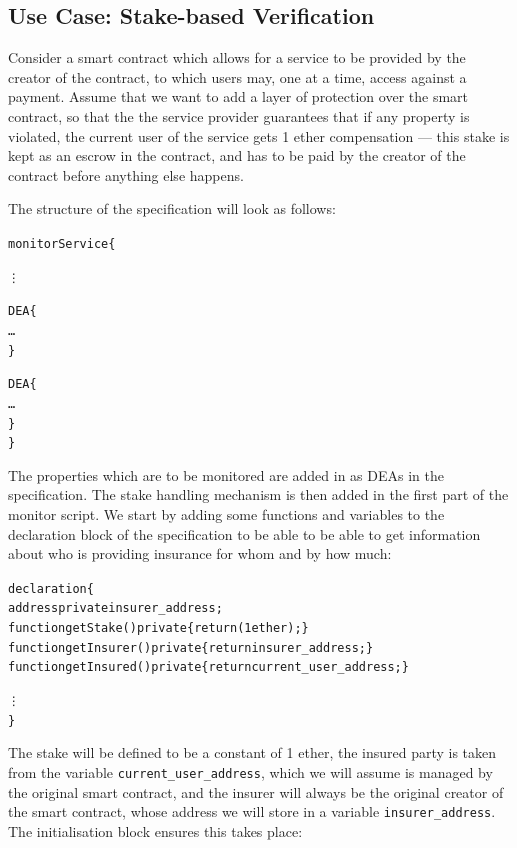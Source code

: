 \documentclass{article}
\begin{document}
  \subsection{Use Case: Stake-based Verification}
  \label{s:example}

  Consider a smart contract which allows for a service to be provided by the creator of the contract, to which users may, one at a time, access against a payment. Assume that we want to add a layer of protection over the smart contract, so that the the service provider guarantees that if any property is violated, the current user of the service gets 1 ether compensation --- this stake is kept as an escrow in the contract, and has to be paid by the creator of the contract before anything else happens. 
  
  The structure of the specification will look as follows:
  
  \small\begin{alltt}
    monitor Service \{
      
      \vdots 
           
      DEA \{
        \ldots 
      \}
      
      DEA \{
        \ldots 
      \}
    \}
  \end{alltt}\normalsize
  
  The properties which are to be monitored are added in as DEAs in the specification. The stake handling mechanism is then added in the first part of the monitor script. We start by adding some functions and variables to the declaration block of the specification to be able to be able to get information about who is providing insurance for whom and by how much:
  
    \small\begin{alltt}
    declaration \{
      address private insurer_address;
      function getStake() private \{ return (1 ether); \}
      function getInsurer() private \{ return insurer\_address; \}
      function getInsured() private \{ return current\_user\_address; \}
      
      \vdots
    \}
    \end{alltt}\normalsize
    
    The stake will be defined to be a constant of 1 ether, the insured party is taken from the variable \texttt{current\_user\_address}, which we will assume is managed by the original smart contract, and the insurer will always be the original creator of the smart contract, whose address we will store in a variable \texttt{insurer\_address}. The initialisation block ensures this takes place:
    
\end{document}
